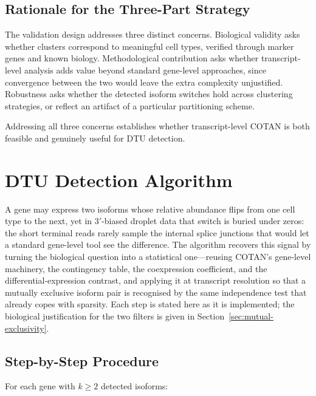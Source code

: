\subsection*{Rationale for the Three-Part Strategy}

The validation design addresses three distinct concerns. Biological validity asks whether clusters correspond to meaningful cell types, verified through marker genes and known biology. Methodological contribution asks whether transcript-level analysis adds value beyond standard gene-level approaches, since convergence between the two would leave the extra complexity unjustified. Robustness asks whether the detected isoform switches hold across clustering strategies, or reflect an artifact of a particular partitioning scheme.

Addressing all three concerns establishes whether transcript-level COTAN is both feasible and genuinely useful for DTU detection.

\section{DTU Detection Algorithm}\label{sec:methods-dtu-algorithm}

A gene may express two isoforms whose relative abundance flips from one cell type to the next, yet in $3'$-biased droplet data that switch is buried under zeros: the short terminal reads rarely sample the internal splice junctions that would let a standard gene-level tool see the difference. The algorithm recovers this signal by turning the biological question into a statistical one---reusing COTAN's gene-level machinery, the contingency table, the \gls{coexpression} coefficient, and the differential-expression contrast, and applying it at transcript resolution so that a mutually exclusive isoform pair is recognised by the same independence test that already copes with sparsity\cite{galfre2021cotan}. Each step is stated here as it is implemented; the biological justification for the two filters is given in Section~\ref{sec:mutual-exclusivity}.

\subsection*{Step-by-Step Procedure}

For each gene with $k \ge 2$ detected isoforms:

